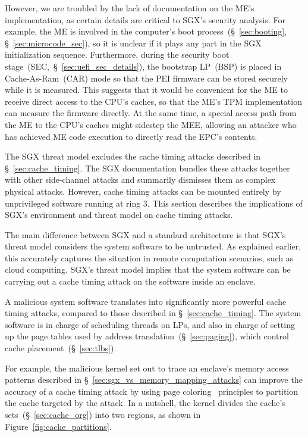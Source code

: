 However, we are troubled by the lack of documentation on the ME's
implementation, as certain details are critical to SGX's security analysis. For
example, the ME is involved in the computer's boot
process~(\S~\ref{sec:booting}, \S~\ref{sec:microcode_sec}), so it is unclear if
it plays any part in the SGX initialization sequence. Furthermore, during the
security boot stage~(SEC,~\S~\ref{sec:uefi_sec_details}), the bootstrap
LP~(BSP) is placed in Cache-As-Ram~(CAR) mode so that the PEI firmware can be
stored securely while it is measured. This suggests that it would be convenient
for the ME to receive direct access to the CPU's caches, so that the ME's TPM
implementation can measure the firmware directly. At the same time, a special
access path from the ME to the CPU's caches might sidestep the MEE, allowing an
attacker who has achieved ME code execution to directly read the EPC's
contents.


\label{sec:sgx_vs_cache_timing_attacks}

The SGX threat model excludes the cache timing attacks described in
\S~\ref{sec:cache_timing}. The SGX documentation bundles these attacks together
with other side-channel attacks and summarily dismisses them as complex physical
attacks. However, cache timing attacks can be mounted entirely by unprivileged
software running at ring 3. This section describes the implications of SGX's
environment and threat model on cache timing attacks.

The main difference between SGX and a standard architecture is that SGX's
threat model considers the system software to be untrusted. As explained
earlier, this accurately captures the situation in remote computation
scenarios, such as cloud computing. SGX's threat model implies that the system
software can be carrying out a cache timing attack on the software inside an
enclave.

A malicious system software translates into significantly more powerful cache
timing attacks, compared to those described in \S~\ref{sec:cache_timing}. The
system software is in charge of scheduling threads on LPs, and also in charge
of setting up the page tables used by address
translation~(\S~\ref{sec:paging}), which control cache
placement~(\S~\ref{sec:tlbs}).

For example, the malicious kernel set out to trace an enclave's memory access
patterns described in \S~\ref{sec:sgx_vs_memory_mapping_attacks} can improve
the accuracy of a cache timing attack by using page
coloring~\cite{kessler1992coloring} principles to
partition~\cite{lin2008coloring} the cache targeted by the attack. In a
nutshell, the kernel divides the cache's sets~(\S~\ref{sec:cache_org}) into
two regions, as shown in Figure~\ref{fig:cache_partitions}.

